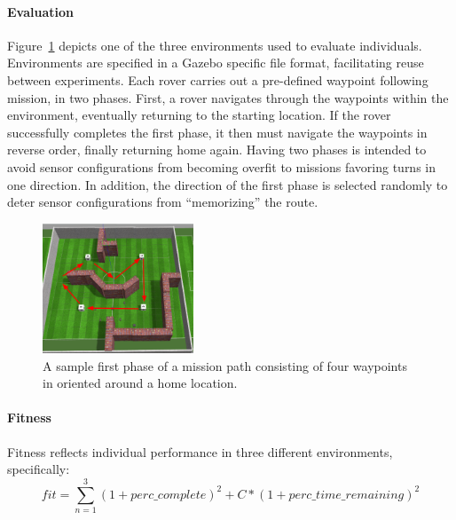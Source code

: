 

\vspace{-0.08in}
\paragraph{Evaluation}
Figure~\ref{waypoint_mission_fig} depicts one of the three environments
used to evaluate individuals.  
%
Environments are specified in a Gazebo specific file format, facilitating reuse between experiments.
%
Each rover carries out a pre-defined waypoint following mission, in two phases. 
%
First, a rover navigates through the waypoints within the environment,
eventually returning to the starting location. 
%
If the rover successfully completes the first phase, it then must navigate the waypoints in reverse order, finally returning home again. 
%
Having two phases is intended to avoid
sensor configurations from becoming overfit to missions favoring turns in one direction.
%
In addition, the direction of the first phase
is selected randomly to deter sensor configurations from ``memorizing'' the route. 

\vspace{-0.05in}
\begin{figure}[ht]
\centering
    \includegraphics[width=0.4\textwidth]{Figures/waypoint_mission.PNG}
    \vspace{-0.1in}
    \caption{A sample first phase of a mission path consisting of four waypoints in oriented around a home location.}
    \label{waypoint_mission_fig}
    \vspace{-0.1in}
\end{figure}

\paragraph{Fitness}
Fitness reflects individual performance in three different environments, specifically:
\begin{equation}
fit = \sum_{n=1}^{3} (1 + perc\_complete)^2 + C * (1 + perc\_time\_remaining)^2
\label{eq:fitness}
\end{equation}

